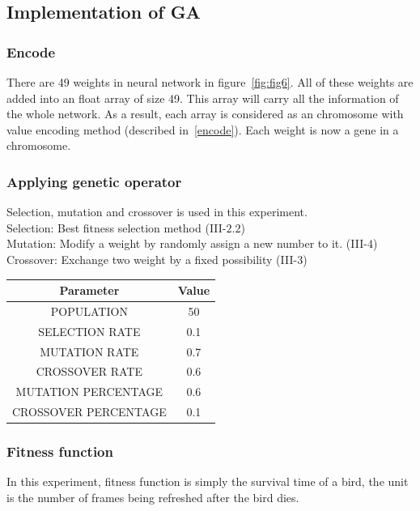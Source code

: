 \documentclass[conference]{IEEEtran}
\begin{document}
\subsection{Implementation of GA}
\subsubsection{Encode}
There are 49 weights in neural network in figure~\ref{fig:fig6}. All of these weights are added into an float array of size 49. This array will carry all the information of the whole network. As a result, each array is considered as an chromosome with value encoding method (described in~\ref{encode}). Each weight is now a gene in a chromosome.
\subsubsection{Applying genetic operator}
Selection, mutation and crossover is used in this experiment.\\
Selection: Best fitness selection method (III-$2.2$)\\
Mutation: Modify a weight by randomly assign a new number to it. (III-$4$)\\
Crossover: Exchange two weight by a fixed possibility (III-$3$)\\
\begin{center}
 \begin{tabular}{||c c||} 
 \hline
 Parameter & Value\\ 
 \hline\hline
 POPULATION & 50 \\ 
 \hline\hline
 SELECTION RATE & 0.1 \\ 
 \hline\hline
 MUTATION RATE & 0.7   \\ 
 \hline
 CROSSOVER RATE & 0.6 \\
 \hline
 MUTATION PERCENTAGE & 0.6 \\
 \hline
 CROSSOVER PERCENTAGE & 0.1 \\[1ex] 
 \hline
\end{tabular}
\end{center}
\subsubsection{Fitness function}
In this experiment, fitness function is simply the survival time of a bird, the unit is the number of frames being refreshed after the bird dies.
\end{document}
